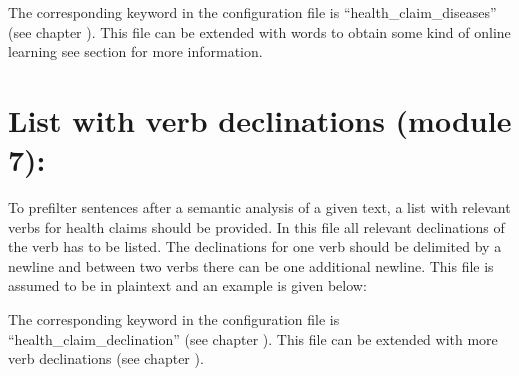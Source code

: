 \documentclass[letterpaper,10pt,english]{sphinxmanual}
\begin{document}
%
\begin{sphinxVerbatim}[commandchars=\\\{\}]
 
\end{sphinxVerbatim}

The corresponding keyword in the configuration file is
“health\_claim\_diseases” (see chapter {\hyperref[\detokenize{configuration:configuration}]{}}). This file
can be extended with words to obtain some kind of online learning see
section {\hyperref[\detokenize{online_learning:diseases-online}]{}} for more information.


\section{List with verb declinations (module 7):}
\label{\detokenize{external_data:list-with-verb-declinations-module-7}}\label{\detokenize{external_data:external-hc-declination}}
To prefilter sentences after a semantic analysis of a given text, a
list with relevant verbs for health claims should be provided. In this
file all relevant declinations of the verb has to be listed. The
declinations for one verb should be delimited by a newline and between
two verbs there can be one additional newline. This file is assumed to
be in plaintext and an example is given below:

%
\begin{sphinxVerbatim}[commandchars=\\\{\}]
 
 
 
 
 
 
 
 

\end{sphinxVerbatim}

The corresponding keyword in the configuration file is
“health\_claim\_declination” (see chapter {\hyperref[\detokenize{configuration:configuration}]{}}). This
file can be extended with more verb declinations (see chapter
{\hyperref[\detokenize{online_learning:declination-online}]{}}).
\end{document}
